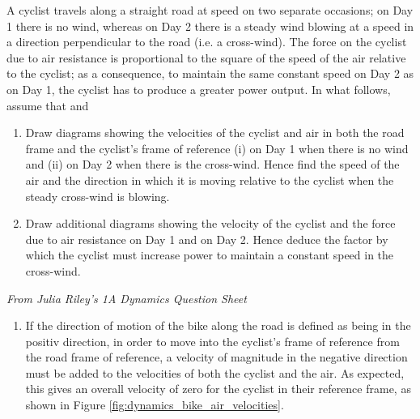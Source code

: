 
%
%
\begin{problem} %
{A cyclist travels along a straight road at speed  on two separate occasions; on Day 1 there is no wind, whereas on Day 2 there is a steady wind blowing at a speed  in a direction perpendicular to the road (i.e. a cross-wind). The force on the cyclist due to air resistance is proportional to the square of the speed of the air relative to the cyclist; as a consequence, to maintain the same constant speed  on Day 2 as on Day 1, the cyclist has to produce a greater power output. In what follows, assume that  and 
\begin{enumerate}
\item Draw diagrams showing the velocities of the cyclist and air in both the road frame and the cyclist’s frame of reference (i) on Day 1 when there is no wind and (ii) on Day 2 when there is the cross-wind. Hence find the speed of the air and the
direction in which it is moving relative to the cyclist when the steady cross-wind is blowing.
\item  Draw additional diagrams showing the velocity of the cyclist and the force due to air resistance on Day 1 and on Day 2. Hence deduce the factor by which the cyclist must increase power to maintain a constant speed in the cross-wind.
\end{enumerate}
}
{\textit{From Julia Riley's 1A Dynamics Question Sheet}}
{\begin{enumerate}
\item 
If the direction of motion of the bike along the road is defined as being in the positiv   direction, in order to move into the cyclist's frame of reference from the road frame of reference, a velocity of magnitude  in the negative  direction must be added to the velocities of both the cyclist and the air. As expected, this gives an overall velocity of zero for the cyclist in their reference frame, as shown in Figure \ref{fig:dynamics_bike_air_velocities}.


\end{enumerate}}
\end{problem}
